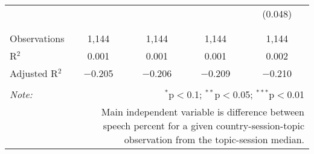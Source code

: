 \begin{table}[!htbp]
\begin{tabular}{@{\extracolsep{5pt}}lcccc}
  &  &  &  & (0.048) \\ 
  & & & & \\ 
\hline \\[-1.8ex] 
Observations & 1,144 & 1,144 & 1,144 & 1,144 \\ 
R$^{2}$ & 0.001 & 0.001 & 0.001 & 0.002 \\ 
Adjusted R$^{2}$ & $-$0.205 & $-$0.206 & $-$0.209 & $-$0.210 \\ 
\hline 
\hline \\[-1.8ex] 
\textit{Note:}  & \multicolumn{4}{r}{$^{*}$p$<$0.1; $^{**}$p$<$0.05; $^{***}$p$<$0.01} \\ 
 & \multicolumn{4}{r}{Main independent variable is difference between speech percent for a given country-session-topic observation from the topic-session median.} \\ 
\end{tabular} 
\end{table} 

